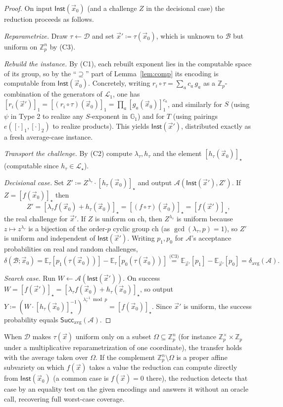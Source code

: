 \documentclass{conjura-solution}
\newcommand{\Gone}{\mathbb{G}_1}
\newcommand{\Zp}{\mathbb{Z}_p}
\newcommand{\Zpx}{\mathbb{Z}_p^{\times}}
\newcommand{\vx}{\vec{x}}
\newcommand{\Inst}{\mathsf{Inst}}
\newcommand{\Succ}{\mathsf{Succ}}
\newcommand{\Ex}{\mathbb{E}}
\newcommand{\LL}{\mathcal{L}}
\newcommand{\ch}{\mathrm{ch}}
\begin{document}
\begin{proof}
On input $\Inst(\vx_0)$ (and a challenge $Z$ in the decisional case) the reduction proceeds
as follows.

\emph{Reparametrize.} Draw $\tau\leftarrow\mathcal D$ and set $\vx'\coloneqq\tau(\vx_0)$,
which is unknown to $\mathcal B$ but uniform on $\Zp^{n}$ by (C3).

\emph{Rebuild the instance.} By (C1), each rebuilt exponent lies in the computable space of
its group, so by the ``$\supseteq$'' part of Lemma~\ref{lem:comp} its encoding is
computable from $\Inst(\vx_0)$. Concretely, writing $r_i\circ\tau=\sum_a c_a\,g_a$ as a
$\Zp$-combination of the generators of $\LL_1$, one has
$[r_i(\vx')]_1=[(r_i\circ\tau)(\vx_0)]_1=\prod_a[g_a(\vx_0)]_1^{c_a}$, and similarly for
$S$ (using $\psi$ in Type 2 to realize any $S$-exponent in $\Gone$) and for $T$ (using
pairings $e([\cdot]_1,[\cdot]_2)$ to realize products). This yields $\Inst(\vx')$,
distributed exactly as a fresh average-case instance.

\emph{Transport the challenge.} By (C2) compute $\lambda_\tau,h_\tau$ and the element
$[h_\tau(\vx_0)]_\star$ (computable since $h_\tau\in\LL_\star$).

\emph{Decisional case.} Set $Z'\coloneqq Z^{\lambda_\tau}\cdot[h_\tau(\vx_0)]_\star$ and
output $\mathcal A(\Inst(\vx'),Z')$. If $Z=[f(\vx_0)]_\star$ then
\[
  Z'=[\lambda_\tau f(\vx_0)+h_\tau(\vx_0)]_\star=[(f\circ\tau)(\vx_0)]_\star=[f(\vx')]_\star,
\]
the real challenge for $\vx'$. If $Z$ is uniform on $\ch$, then $Z^{\lambda_\tau}$ is
uniform because $z\mapsto z^{\lambda_\tau}$ is a bijection of the order-$p$ cyclic group
$\ch$ (as $\gcd(\lambda_\tau,p)=1$), so $Z'$ is uniform and independent of $\Inst(\vx')$.
Writing $p_1,p_0$ for $\mathcal A$'s acceptance probabilities on real and random challenges,
\[
  \delta(\mathcal B;\vx_0)
  =\Ex_{\tau}[p_1(\tau(\vx_0))]-\Ex_{\tau}[p_0(\tau(\vx_0))]
  \overset{\text{(C3)}}{=}\Ex_{\vx'}[p_1]-\Ex_{\vx'}[p_0]
  =\delta_{\mathrm{avg}}(\mathcal A).
\]

\emph{Search case.} Run $W\leftarrow\mathcal A(\Inst(\vx'))$. On success
$W=[f(\vx')]_\star=[\lambda_\tau f(\vx_0)+h_\tau(\vx_0)]_\star$, so output
$Y\coloneqq(W\cdot[h_\tau(\vx_0)]_\star^{-1})^{\lambda_\tau^{-1}\bmod p}=[f(\vx_0)]_\star$.
Since $\vx'$ is uniform, the success probability equals $\Succ_{\mathrm{avg}}(\mathcal A)$.
\end{proof}

\begin{remark}[relaxing (C3)]
\label{rem:c3}
When $\mathcal D$ makes $\tau(\vx)$ uniform only on a subset $\Omega\subseteq\Zp^{n}$ (for
instance $\Zpx\times\Zp$ under a multiplicative reparametrization of one coordinate), the
transfer holds with the average taken over $\Omega$. If the complement $\Zp^{n}\setminus
\Omega$ is a proper affine subvariety on which $f(\vx)$ takes a value the reduction can
compute directly from $\Inst(\vx_0)$ (a common case is $f(\vx)=0$ there), the reduction
detects that case by an equality test on the given encodings and answers it without an
oracle call, recovering full worst-case coverage.
\end{remark}
\end{document}
